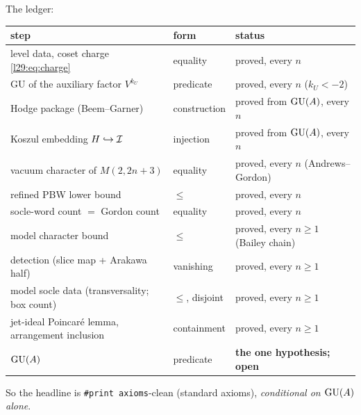 \begin{remark}
The ledger:
\begin{center}\small
\begin{tabular}{p{}p{}p{}}
\toprule
step & form & status\\
\midrule
level data, coset charge \eqref{l29:eq:charge} & equality & proved, every $n$\\
GU of the auxiliary factor $V^{k_U}$ & predicate & proved, every $n$ ($k_U<-2$)\\
Hodge package (Beem--Garner) & construction & proved from $\mathrm{GU}(A)$, every $n$\\
Koszul embedding $H\hookrightarrow\mathcal I$ & injection & proved from $\mathrm{GU}(A)$, every $n$\\
vacuum character of $M(2,2n+3)$ & equality & proved, every $n$ (Andrews--Gordon)\\
refined PBW lower bound & $\le$ & proved, every $n$\\
socle-word count $=$ Gordon count & equality & proved, every $n$\\
model character bound & $\le$ & proved, every $n\ge1$ (Bailey chain)\\
detection (slice map + Arakawa half) & vanishing & proved, every $n\ge1$\\
model socle data (transversality; box count) & $\le$, disjoint & proved, every $n\ge1$\\
jet-ideal Poincar\'e lemma, arrangement inclusion & containment & proved, every $n\ge1$\\
$\mathrm{GU}(A)$ & predicate & \textbf{the one hypothesis; open}\\
\bottomrule
\end{tabular}
\end{center}
So the headline is \texttt{\#print axioms}-clean (standard axioms), \emph{conditional on $\mathrm{GU}(A)$ alone}.
\end{remark}

